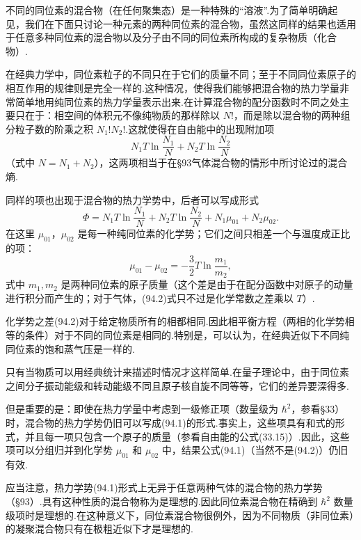 不同的同位素的混合物（在任何聚集态）是一种特殊的“溶液”.为了简单明确起见，我们在下面只讨论一种元素的两种同位素的混合物，虽然这同样的结果也适用于任意多种同位素的混合物以及分子由不同的同位素所构成的复杂物质（化合物）.

在经典力学中，同位素粒子的不同只在于它们的质量不同；至于不同同位素原子的相互作用的规律则是完全一样的.这种情况，使得我们能够把混合物的热力学量非常简单地用纯同位素的热力学量表示出来.在计算混合物的配分函数时不同之处主要只在于：相空间的体积元不像纯物质的那样除以 $N$!，而是除以混合物的两种组分粒子数的阶乘之积 $N_1!N_2!$.这就使得在自由能中的出现附加项
\begin{equation*}
  N_1T\ln\frac{N_1}{N}+N_2T\ln\frac{N_2}{N}
\end{equation*}
（式中 $N=N_1+N_2$），这两项相当于在§93气体混合物的情形中所讨论过的混合熵.

同样的项也出现于混合物的热力学势中，后者可以写成形式
\begin{equation}
  \varPhi=N_1T\ln\frac{N_1}{N}+N_2T\ln\frac{N_2}{N}
  +N_1\mu_{01}+N_2\mu_{02}.
\end{equation}
在这里 $\mu_{01}$，$\mu_{02}$ 是每一种纯同位素的化学势；它们之间只相差一个与温度成正比的项：
\begin{equation}
  \mu_{01}-\mu_{02}=-\frac{3}{2}T\ln\frac{m_1}{m_2},
\end{equation}
式中 $m_1,m_2$ 是两种同位素的原子质量（这个差是由于在配分函数中对原子的动量进行积分而产生的；对于气体，(94.2)式只不过是化学常数之差乘以 $T$）.

化学势之差(94.2)对于给定物质所有的相都相同.因此相平衡方程（两相的化学势相等的条件）对于不同的同位素是相同的.特别是，可以认为，在经典近似下不同纯同位素的饱和蒸气压是一样的.

只有当物质可以用经典统计来描述时情况才这样简单.在量子理论中，由于同位素之间分子振动能级和转动能级不同且原子核自旋不同等等，它们的差异要深得多.

但是重要的是：即使在热力学量中考虑到一级修正项（数量级为 $\hbar^2$，参看§33）时，混合物的热力学势仍旧可以写成(94.1)的形式.事实上，这些项具有和式的形式，并且每一项只包含一个原子的质量（参看自由能的公式(33.15)）.因此，这些项可以分组归并到化学势 $\mu_{01}$ 和 $\mu_{02}$ 中，结果公式(94.1)（当然不是(94.2)）仍旧有效.

应当注意，热力学势(94.1)形式上无异于任意两种气体的混合物的热力学势（§93）.具有这种性质的混合物称为是理想的.因此同位素混合物在精确到 $\hbar^2$ 数量级项时是理想的.在这种意义下，同位素混合物很例外，因为不同物质（非同位素）的凝聚混合物只有在极粗近似下才是理想的.

